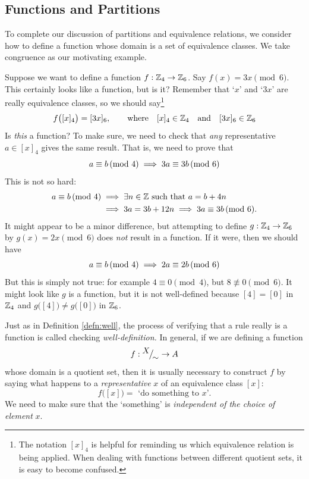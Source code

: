 \subsection{Functions and Partitions}

To complete our discussion of partitions and equivalence relations, we consider how to define a function whose domain is a set of equivalence classes. We take congruence as our motivating example.\par

Suppose we want to define a function $f:\mathbb{Z}_4\to\mathbb{Z}_6$. Say $f(x)=3x\pmod 6$. This certainly looks like a function, but is it? Remember that `$x$' and `$3x$' are really equivalence classes, so we should say\footnote{The notation $[x]_4$ is helpful for reminding us which equivalence relation is being applied. When dealing with functions between different quotient sets, it is easy to become confused.}
\[
	f\bigl([x]_4\bigr)=[3x]_6,\qquad\text{where}\quad [x]_4\in\mathbb{Z}_4\quad\text{and}\quad [3x]_6\in\mathbb{Z}_6
\]
Is \emph{this} a function? To make sure, we need to check that \emph{any} representative $a\in[x]_4$ gives the same result. That is, we need to prove that
\[
	a\equiv b\negthickspace\pmod{4}\implies 3a\equiv 3b\negthickspace\pmod{6}
\]
This is not so hard:
\begin{align*}
	a\equiv b\negthickspace\pmod{4}&\implies \exists n\in\mathbb{Z}\text{ such that }a=b+4n\\
	&\implies 3a=3b+12n\implies 3a\equiv 3b\negthickspace\pmod{6}.
\end{align*}
It might appear to be a minor difference, but attempting to define $g:\mathbb{Z}_4\to\mathbb{Z}_6$ by $g(x)=2x\pmod 6$ does \emph{not} result in a function. If it were, then we should have
\[
	a\equiv b\negthickspace\pmod{4}\implies 2a\equiv 2b\negthickspace\pmod{6}
\]
But this is simply not true: for example $4\equiv 0\pmod 4$, but $8\not\equiv 0\pmod 6$. It might look like $g$ is a function, but it is not well-defined because $[4]=[0]$ in $\mathbb{Z}_4$ and $g\bigl([4]\bigr)\neq g\bigl([0]\bigr)$ in $\mathbb{Z}_6$.\par

Just as in Definition \ref{defn:well}, the process of verifying that a rule really is a function is called checking \emph{well-definition.} In general, if we are defining a function
\[
	f:{}^{\textstyle {X}}\!\big/_{\textstyle \!{\sim}}\to A
\]
whose domain is a quotient set, then it is usually necessary to construct $f$ by saying what happens to a \emph{representative} $x$ of an equivalence class $[x]$:
\[
	f\bigl([x]\bigr)=\text{ `do something to $x$'.}\tag{$\ast$}
\]
We need to make sure that the `something' is \emph{independent of the choice of element} $x$.

